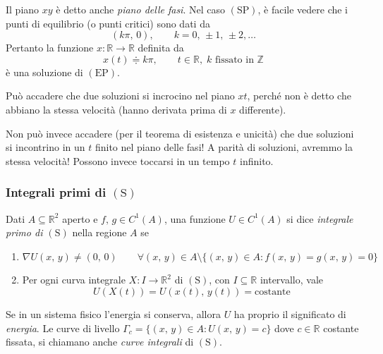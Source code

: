 Il piano $xy$ è detto anche \emph{piano delle fasi}.  Nel caso $\mathrm{(SP)}$, è facile vedere che i punti di equilibrio (o punti critici) sono dati da
$$
(k\pi,\,0), \qquad k = 0,\, \pm 1,\, \pm 2, \ldots
$$
Pertanto la funzione $x : \mathbb{R} \longrightarrow \mathbb{R}$ definita da
$$
x(t) \doteqdot k\pi, \qquad t \in \mathbb{R}, \; k \text{ fissato in } \mathbb{Z}
$$
è una soluzione di $\mathrm{(EP)}$.

\begin{obs}
Può accadere che due soluzioni si incrocino nel piano $xt$, perché non è detto che abbiano la stessa velocità (hanno derivata prima di $x$ differente).
\begin{center}
\def\svgwidth{8cm}

\end{center}
Non può invece accadere (per il teorema di esistenza e unicità) che due soluzioni si incontrino in un $t$ finito nel piano delle fasi! A parità di soluzioni, avremmo la stessa velocità! Possono invece toccarsi in un tempo $t$ infinito.
\begin{center}
\def\svgwidth{15cm}

\end{center}
\end{obs}



\subsubsection{Integrali primi di $\mathrm{(S)}$}
\begin{definition}
Dati $A \subseteq \mathbb{R}^2$ aperto e $f,\,g \in C^1(A)$, una funzione $U \in C^1(A)$ si dice \emph{integrale primo di $\mathrm{(S)}$} nella regione $A$ se
\begin{enumerate}[labelindent=\parindent,leftmargin=*,label=\textnormal{(\roman*)},start=1]
\item $\nabla U(x,\,y) \neq (0,\,0) \qquad \forall (x,\,y) \in A \setminus \lbrace (x,\,y) \in A : f(x,\,y) = g(x,\,y) = 0 \rbrace$
\item Per ogni curva integrale $X : I \longrightarrow \mathbb{R}^2$ di $\mathrm{(S)}$, con $I \subseteq \mathbb{R}$ intervallo, vale
$$
U(X(t)) = U(x(t),\,y(t)) = \text{costante}
$$
\end{enumerate}
\end{definition}


Se in un sistema fisico l'energia si conserva, allora $U$ ha proprio il significato di \emph{energia}. Le curve di livello $\Gamma_c = \lbrace (x,\,y) \in A : U(x,\,y) = c \rbrace$ dove $c \in \mathbb{R}$ costante fissata, si chiamano anche \emph{curve integrali} di $\mathrm{(S)}$.

